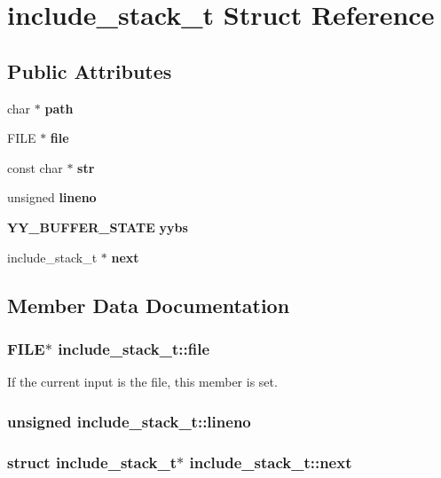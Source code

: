 \section{include\_\-stack\_\-t  Struct Reference}
\label{structinclude__stack__t}
\subsection*{Public Attributes}
\begin{CompactItemize}
\item 
char $\ast$ {\bf path}
\item 
FILE $\ast$ {\bf file}
\item 
const char $\ast$ {\bf str}
\item 
unsigned {\bf lineno}
\item 
{\bf YY\_\-BUFFER\_\-STATE} {\bf yybs}
\item 
include\_\-stack\_\-t $\ast$ {\bf next}
\end{CompactItemize}


\subsection{Member Data Documentation}
\subsubsection{\setlength{\rightskip}{0pt plus 5cm}FILE$\ast$ include\_\-stack\_\-t::file}\label{structinclude__stack__t_m1}


If the current input is the file, this member is set. 
\subsubsection{\setlength{\rightskip}{0pt plus 5cm}unsigned include\_\-stack\_\-t::lineno}\label{structinclude__stack__t_m3}


\subsubsection{\setlength{\rightskip}{0pt plus 5cm}struct include\_\-stack\_\-t$\ast$ include\_\-stack\_\-t::next}\label{structinclude__stack__t_m5}


